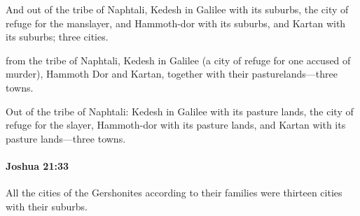 			\begin{versebox}
					\item[BHS] 
					\item[ASV] And out of the tribe of Naphtali, Kedesh in Galilee with its suburbs, the city of refuge for the manslayer, and Hammoth-dor with its suburbs, and Kartan with its suburbs; three cities.
					\item[NIV] from the tribe of Naphtali, Kedesh in Galilee (a city of refuge for one accused of murder), Hammoth Dor and Kartan, together with their pasturelands—three towns.
					\item[NRSV] Out of the tribe of Naphtali: Kedesh in Galilee with its pasture lands, the city of refuge for the slayer, Hammoth-dor with its pasture lands, and Kartan with its pasture lands—three towns.
			\end{versebox}

		\paragraph{Joshua 21:33} %
			\label{JOSHUA-21-33}

			All the cities of the Gershonites according to their families were thirteen cities with their suburbs.

